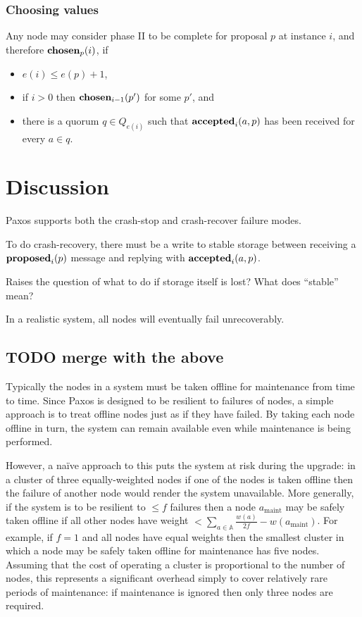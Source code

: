 \documentclass[journal]{IEEEtran}
\begin{document}
\subsubsection{Choosing values} Any node may consider phase II to be complete
for proposal $p$ at instance $i$, and therefore $\mathbf{chosen}_{p}(i)$, if
\begin{itemize} \item $e(i) \le e(p) + 1$, \item if $i > 0$ then
$\mathbf{chosen}_{i-1}(p')$ for some $p'$, and \item there is a quorum $q \in Q_{e(i)}$
such that $\mathbf{accepted}_{i}(a,p)$ has been received for every $a \in q$.  \end{itemize}

\section{Discussion}\label{discussion}

Paxos supports both the crash-stop and crash-recover failure modes.

To do crash-recovery, there must be a write to stable storage between
receiving a $\mathbf{proposed}_{i}(p)$ message and replying with $\mathbf{accepted}_{i}(a,p)$.

Raises the question of what to do if storage itself is lost? What does
``stable'' mean?

In a realistic system, all nodes will eventually fail unrecoverably.





\subsection{TODO merge with the above}

Typically the nodes in a system must be taken offline for maintenance from time
to time. Since Paxos is designed to be resilient to failures of nodes, a simple
approach is to treat offline nodes just as if they have failed. By taking each
node offline in turn, the system can remain available even while maintenance is
being performed.

However, a na\"ive approach to this puts the system at risk during the upgrade:
in a cluster of three equally-weighted nodes if one of the nodes is taken
offline then the failure of another node would render the system unavailable.
More generally, if the system is to be resilient to $\le f$ failures then a
node $a_{\textrm{maint}}$ may be safely taken offline if all other nodes have
weight $< \sum_{a \in \mathbb A} \frac{w(a)}{2f} - w(a_{\textrm{maint}})$. For
example, if $f = 1$ and all nodes have equal weights then the smallest cluster
in which a node may be safely taken offline for maintenance has five nodes.
Assuming that the cost of operating a cluster is proportional to the number of
nodes, this represents a significant overhead simply to cover relatively rare
periods of maintenance: if maintenance is ignored then only three nodes are
required.
\end{document}
